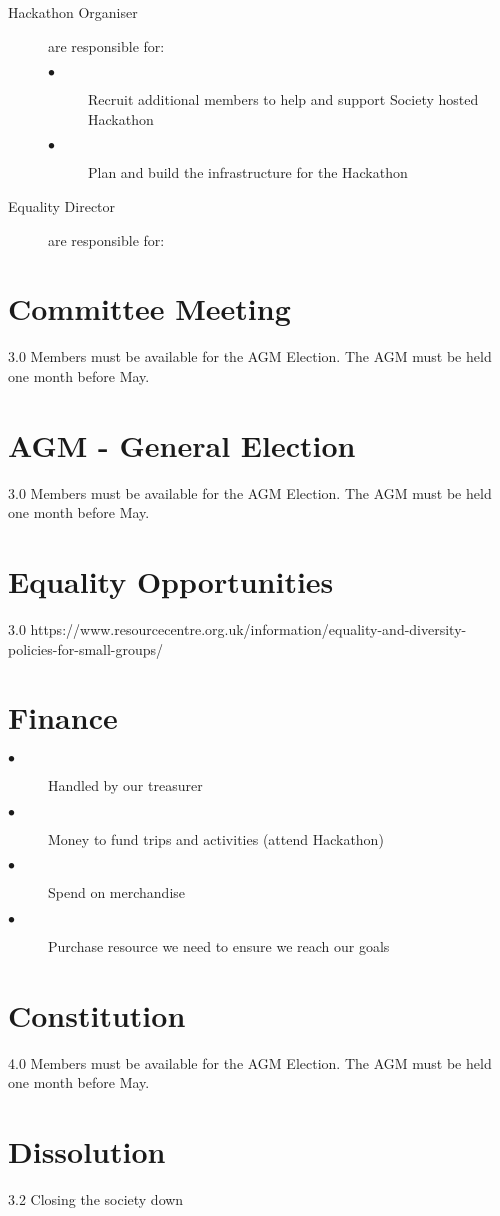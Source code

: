 \documentclass{report}
\begin{document}
\begin{description}
    \item[Hackathon Organiser] are responsible for: 
      \begin{description}
        \item[$\bullet$] Recruit additional members to help and support Society hosted
        Hackathon
        \item[$\bullet$] Plan and build the infrastructure for the Hackathon
      \end{description}

    \item[Equality Director] are responsible for: 

  \end{description}
  
  \section{Committee Meeting}
  3.0 Members must be available for the AGM Election. The AGM must be held one month before May.
  
  \section{AGM - General Election}
  3.0 Members must be available for the AGM Election. The AGM must be held one month before May.
  
  
  \section{Equality Opportunities}
  3.0 https://www.resourcecentre.org.uk/information/equality-and-diversity-policies-for-small-groups/
  
  \section{Finance}
  \begin{description}
    \item[$\bullet$] Handled by our treasurer
    \item[$\bullet$] Money to fund trips and activities (attend Hackathon)
    \item[$\bullet$] Spend on merchandise
    \item[$\bullet$] Purchase resource we need to ensure we reach our goals
  \end{description}
  
  \section{Constitution}
  4.0 Members must be available for the AGM Election. The AGM must be held one month before May.
  
  
  \section{Dissolution}
  3.2 Closing the society down
  
  
\end{document}
